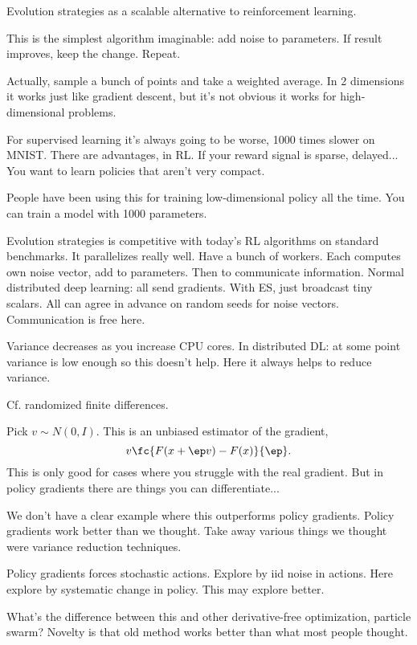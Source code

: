 Evolution strategies as a scalable alternative to reinforcement learning.

This is the simplest algorithm imaginable: add noise to parameters. If result improves, keep the change. Repeat.

Actually, sample a bunch of points and take a weighted average. In 2 dimensions it works just like gradient descent, but it's not obvious it works for high-dimensional problems.

For supervised learning it's always going to be worse, 1000 times slower on MNIST. There are advantages, in RL. If your reward signal is sparse, delayed... You want to learn policies that aren't very compact.

People have been using this for training low-dimensional policy all the time. You can train a model with 1000 parameters.

Evolution strategies is competitive with today's RL algorithms on standard benchmarks. It parallelizes really well. Have a bunch of workers. Each computes own noise vector, add to parameters. Then to communicate information. Normal distributed deep learning: all send gradients. With ES, just broadcast tiny scalars. All can agree in advance on random seeds for noise vectors. Communication is free here.

Variance decreases as you increase CPU cores. In distributed DL: at some point variance is low enough so this doesn't help. Here it always helps to reduce variance.

Cf. randomized finite differences.

Pick $v\sim N(0,I)$. This is an unbiased estimator of the gradient,
$$
v\fc{F(x+\ep v)-F(x)}{\ep}.
$$
This is only good for cases where you struggle with the real gradient. But in policy gradients there are things you can differentiate...

We don't have a clear example where this outperforms policy gradients. Policy gradients work better than we thought. Take away various things we thought were variance reduction techniques. 

Policy gradients forces stochastic actions. Explore by iid noise in actions. Here explore by systematic change in policy. This may explore better. %

What's the difference between this and other derivative-free optimization, particle swarm? Novelty is that old method works better than what most people thought.

